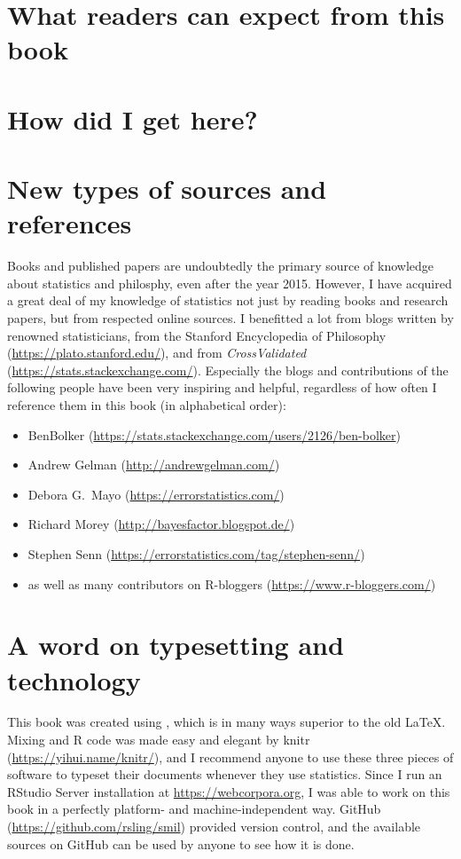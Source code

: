 
\section*{What readers can expect from this book}


\section*{How did I get here?}


\section*{New types of sources and references}

Books and published papers are undoubtedly the primary source of knowledge about statistics and philosphy, even after the year 2015.
However, I have acquired a great deal of my knowledge of statistics not just by reading books and research papers, but from respected online sources.
I benefitted a lot from blogs written by renowned statisticians, from the Stanford Encyclopedia of Philosophy (\url{https://plato.stanford.edu/}), and from  \textit{CrossValidated} (\url{https://stats.stackexchange.com/}).
Especially the blogs and contributions of the following people have been very inspiring and helpful, regardless of how often I reference them in this book (in alphabetical order):

\begin{itemize}
  \item BenBolker (\url{https://stats.stackexchange.com/users/2126/ben-bolker})
  \item Andrew Gelman (\url{http://andrewgelman.com/})
  \item Debora G.\ Mayo (\url{https://errorstatistics.com/})
  \item Richard Morey (\url{http://bayesfactor.blogspot.de/})
  \item Stephen Senn (\url{https://errorstatistics.com/tag/stephen-senn/})
  \item as well as many contributors on R-bloggers (\url{https://www.r-bloggers.com/})
\end{itemize}


\section*{A word on typesetting and technology}

This book was created using \XeLaTeX, which is in many ways superior to the old \LaTeX.
Mixing \XeLaTeX and R code was made easy and elegant by knitr (\url{https://yihui.name/knitr/}), and I recommend anyone to use these three pieces of software to typeset their documents whenever they use statistics.
Since I run an RStudio Server installation at \url{https://webcorpora.org}, I was able to work on this book in a perfectly platform- and machine-independent way.
GitHub (\url{https://github.com/rsling/smil}) provided version control, and the available sources on GitHub can be used by anyone to see how it is done.
